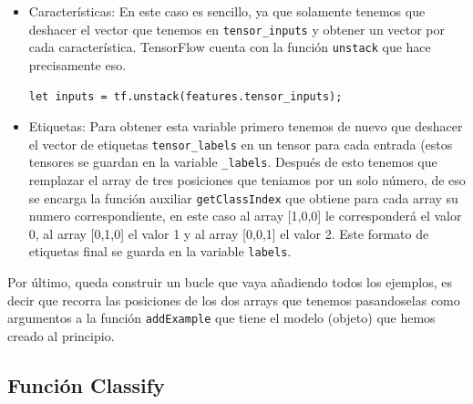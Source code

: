 \documentclass[a4paper, 12pt]{book}
\begin{document}
\begin{itemize}
	\item Características: En este caso es sencillo, ya que solamente tenemos que deshacer el vector que tenemos en \texttt{tensor\_inputs} y obtener un vector por cada característica. TensorFlow cuenta con la función \texttt{unstack} que hace precisamente eso.
\begin{verbatim}
let inputs = tf.unstack(features.tensor_inputs);
\end{verbatim}	
	\item Etiquetas: Para obtener esta variable primero tenemos de nuevo que deshacer el vector de etiquetas \texttt{tensor\_labels} en un tensor para cada entrada (estos tensores se guardan en la variable \texttt{\_labels}. Después de esto tenemos que remplazar el array de tres posiciones que teniamos por un solo número, de eso se encarga la función auxiliar  \texttt{getClassIndex} que obtiene para cada array su numero correspondiente, en este caso al array [1,0,0] le corresponderá el valor 0, al array [0,1,0] el valor 1 y al array [0,0,1] el valor 2. Este formato de etiquetas final se guarda en la variable \texttt{labels}.
\end{itemize}

Por último, queda construir un bucle que vaya añadiendo todos los ejemplos, es decir que recorra las posiciones de los dos arrays que tenemos pasandoselas como argumentos a la función \texttt{addExample} que tiene el modelo (objeto) que hemos creado al principio.

\subsection{Función Classify} 
\label{sec:funcionclassifyknn}
\end{document}
